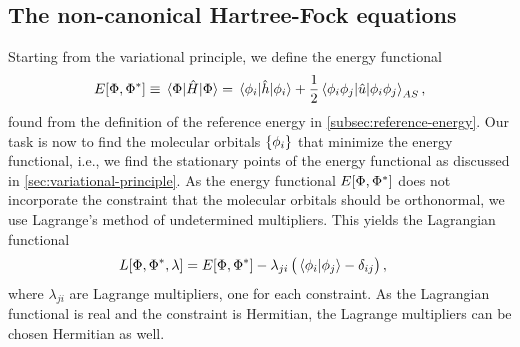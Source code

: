        \subsection{The non-canonical Hartree-Fock equations}
            Starting from the variational principle, we define the energy
            functional
            \begin{align}
                E[\Phi, \Phi^{*}]
                \equiv \mel*{\Phi}{\hat{H}}{\Phi}
                =
                \mel*{\phi_i}{\hat{h}}{\phi_i}
                + \frac{1}{2}\mel*{\phi_i\phi_j}{\hat{u}}{\phi_i\phi_j}_{AS},
                \label{eq:energy_func_hf}
            \end{align}
            found from the definition of the reference energy in
            \autoref{subsec:reference-energy}.
            Our task is now to find the molecular orbitals $\left\{ \phi_i \right\}$ that
            minimize the energy functional, i.e., we find the stationary points
            of the energy functional as discussed in
            \autoref{sec:variational-principle}.
            As the energy functional $E[\Phi, \Phi^{*}]$ does not
            incorporate the constraint that the molecular orbitals should be
            orthonormal, we use Lagrange's method of undetermined multipliers.
            This yields the Lagrangian functional
            \begin{align}
                L[\Phi, \Phi^{*}, \lambda]
                &= E[\Phi, \Phi^{*}]
                - \lambda_{ji}\left( 
                    \braket*{\phi_i}{\phi_j}
                    - \delta_{ij}
                 \right),
            \end{align}
            where $\lambda_{ji}$ are Lagrange multipliers, one for each
            constraint.
            As the Lagrangian functional is real and the constraint is
            Hermitian, the Lagrange multipliers can be chosen Hermitian as well.

